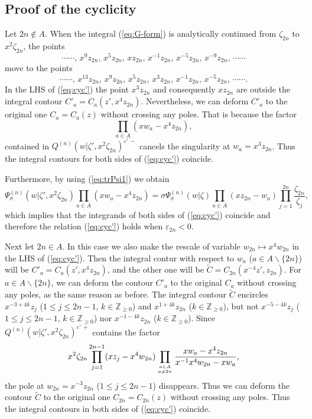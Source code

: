 \documentclass[a4paper,10pt]{article}
\begin{document}
\subsection{Proof of the cyclicity} 

Let $2n\not\in A$. When the integral (\ref{eq:G-form}) 
is analytically continued from $\zeta_{2n}$ to 
$x^2 \zeta_{2n}$, the points 
$$
\cdots\cdots, \, x^9 z_{2n}, \, 
x^5 z_{2n}, \, xz_{2n}, \, x^{-1}z_{2n}, 
\, x^{-5}z_{2n}, \, x^{-9}z_{2n}, \, \cdots\cdots
$$ 
move to the points 
$$
\cdots\cdots, \, x^{13}z_{2n}, \, 
x^9 z_{2n}, \, x^5 z_{2n}, \, x^3 z_{2n}, 
\, x^{-1}z_{2n}, \, x^{-5}z_{2n}, \, \cdots\cdots. 
$$ 
In the LHS of (\ref{eq:cyc'}) the point $x^3 z_{2n}$ 
and consequently $xz_{2n}$ are outside the integral 
contour 
$C'_a=C_a (z', x^4 z_{2n})$. 
Nevertheless, we can deform $C'_a$ to the original one 
$C_a =C_a (z)$ 
without crossing any poles. That is because 
the factor 
$$
\prod_{a\in A} (xw_a -x^4 z_{2n}), 
$$
contained in 
$Q^{(n)}(w|\zeta' , x^2 \zeta_{2n})^{\varepsilon'\,-}$ 
cancels the singularity at $w_a =x^3 z_{2n}$. 
Thus the integral contours for both sides of 
(\ref{eq:cyc'}) coincide. 

Furthermore, by using (\ref{eq:trPsi1}) we obtain 
$$
\Psi^{(n)}_\sigma (w|\zeta', x^2 \zeta_{2n})
\prod_{a\in A} (xw_a -x^4 z_{2n})=\sigma
\Psi^{(n)}_\sigma (w|\zeta)
\prod_{a\in A} (xz_{2n}-w_a ) 
\prod_{j=1}^{2n} \frac{\zeta_{2n}}{\zeta_j}, 
$$
which implies that the integrands of both sides of 
(\ref{eq:cyc'}) coincide and therefore the relation 
(\ref{eq:cyc'}) holds when $\varepsilon_{2n}<0$. 

Next let $2n\in A$. In this case we also make the rescale 
of variable $w_{2n}\mapsto x^4 w_{2n}$ in the LHS of 
(\ref{eq:cyc'}). Then the integral 
contur with respect to $w_a$ ($a\in A\backslash \{ 2n\}$) 
will be $C'_a =C_a (z', x^4 z_{2n})$, 
and the other one will be 
$\widetilde{C}=C_{2n}(x^{-4}z', z_{2n})$. 
For $a\in A\backslash \{ 2n\}$, we can deform the contour 
$C'_a$ to the original $C_a$ without crossing any poles, 
as the same reason as before. The integral contour 
$\widetilde{C}$ encircles $x^{-3+4k}z_j$ 
($1\leqslant j\leqslant 2n-1$, 
$k\in \mathbb{Z}_{\geqslant 0}$) and $x^{1+4k}z_{2n}$ 
($k\in \mathbb{Z}_{\geqslant 0}$), but not 
$x^{-5-4k}z_j$ ($1\leqslant j\leqslant 2n-1$, 
$k\in \mathbb{Z}_{\geqslant 0}$) nor $x^{-1-4k}z_{2n}$ 
($k\in \mathbb{Z}_{\geqslant 0}$). Since 
$Q^{(n)}(w|\zeta' , x^2 \zeta_{2n})^{\varepsilon'\,+}$ 
contains the factor 
\begin{equation}
x^2 \zeta_{2n}\prod_{j=1}^{2n-1} (xz_j -x^4 w_{2n})
\prod_{a\in A\atop a\neq 2n} 
\frac{xw_a -x^4 z_{2n}}{x^{-1}x^4w_{2n}-xw_a}, 
\label{eq:Qtr}
\end{equation}
the pole at $w_{2n}=x^{-3}z_{2n}$ ($1\leqslant j\leqslant 2n-1$) 
disappears. Thus we can deform the contour 
$\widetilde{C}$ to the original one $C_{2n}=C_{2n}(z)$ 
without crossing any poles. Thus the integral contours 
in both sides of (\ref{eq:cyc'}) coincide. 
\end{document}
